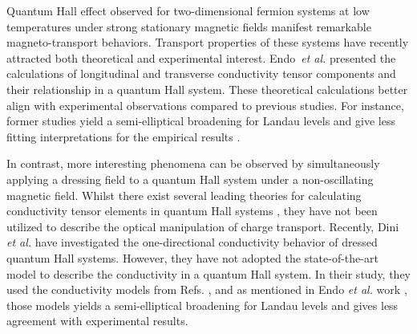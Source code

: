 Quantum Hall effect \cite{girvin90} observed for two-dimensional fermion systems at low temperatures under strong stationary magnetic fields manifest remarkable magneto-transport behaviors. Transport properties of these systems have recently attracted both theoretical \cite{ando72,ando74_1,ando74_2,ando74_3,ando74_4,ando82,endo09} and experimental \cite{allerman95,tieke97,pan05} interest.
Endo \textit{et al.} \cite{endo09} presented the calculations of longitudinal and transverse conductivity tensor components and their relationship in a quantum Hall system. These theoretical calculations better align with experimental observations compared to previous studies. For instance, former studies yield a semi-elliptical broadening for Landau levels and give less fitting interpretations for the empirical results \cite{endo09}.

In contrast, more interesting phenomena can be observed by simultaneously applying a dressing field to a quantum Hall system under a non-oscillating magnetic field.
Whilst there exist several leading theories for calculating conductivity tensor elements in quantum Hall systems \cite{ando74_1,ando82,endo09}, they have not been utilized to describe the optical manipulation of charge transport.
Recently, Dini \textit{et al.} \cite{dini16} have investigated the one-directional conductivity behavior of dressed quantum Hall systems. However, they have not adopted the state-of-the-art model to describe the conductivity in a quantum Hall system. In their study, they used the conductivity models from Refs. \cite{ando74_1,ando82}, and as mentioned in Endo \textit{et al.} work \cite{endo09}, those models yields a semi-elliptical broadening for Landau levels and gives less agreement with experimental results.

